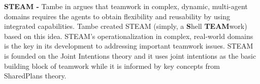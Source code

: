\documentclass[a4paper, 10pt]{article}
\begin{document}
\begin{small}


\textbf{STEAM -} Tambe in \cite{tambe:flexible-teamwork} argues that teamwork in
complex, dynamic, multi-agent domains requires the agents to obtain flexibility
and reusability by using integrated capabilities. Tambe created STEAM (simply, a
\textbf{S}hell \textbf{TEAM}work) based on this idea. STEAM's operationalization
in complex, real-world domains is the key in its development to addressing 
important teamwork issues. STEAM is founded on the Joint Intentions theory and
it uses joint intentions as the basic building block of teamwork while it is
informed by key concepts from SharedPlans theory.


\end{small}
\end{document}
